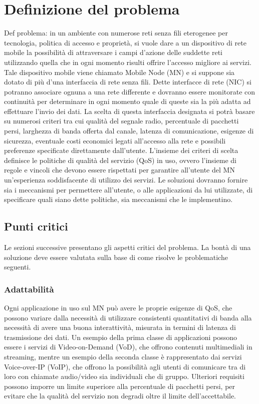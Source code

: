 \documentclass[12pt,a4paper,openright,twoside,draft]{book}
\begin{document}
\chapter{Definizione del problema}
\lhead[\fancyplain{}{\bfseries\thepage}]{\fancyplain{}{\bfseries\rightmark}}
 Def problema: in un ambiente con numerose reti
senza fili eterogenee per tecnologia, politica di accesso e proprietà,
si vuole dare a un dispositivo di rete mobile la possibilità di
attraversare i campi d'azione delle suddette reti utilizzando quella
che in ogni momento risulti offrire l'accesso migliore ai
servizi. Tale dispositivo mobile viene chiamato Mobile Node (MN) e si
suppone sia dotato di più d'una interfaccia di rete senza fili. Dette
interfacce di rete (NIC) si potranno associare ognuna a una rete
differente e dovranno essere monitorate con continuità per determinare
in ogni momento quale di queste sia la più adatta ad effettuare
l'invio dei dati. La scelta di questa interfaccia designata si potrà
basare su numerosi criteri tra cui qualità del segnale radio,
percentuale di pacchetti persi, larghezza di banda offerta dal canale,
latenza di comunicazione, esigenze di sicurezza, eventuale costi
economici legati all'accesso alla rete e possibili preferenze
specificate direttamente dall'utente. L'insieme dei criteri di scelta
definisce le politiche di qualità del servizio (QoS) in uso, ovvero
l'insieme di regole e vincoli che devono essere rispettati per
garantire all'utente del MN un'esperienza soddisfacente di utilizzo
dei servizi. Le soluzioni dovranno fornire sia i meccanismi per
permettere all'utente, o alle applicazioni da lui utilizzate, di
specificare quali siano dette politiche, sia meccanismi che le
implementino.

\section{Punti critici}
\label{sec:punti-critici}
Le sezioni successive presentano gli aspetti critici del problema. La
bontà di una soluzione deve essere valutata sulla base di come risolve
le problematiche seguenti.

\subsection{Adattabilità}
Ogni applicazione in uso sul MN può avere le proprie esigenze di QoS,
che possono variare dalla necessità di utilizzare consistenti
quantitativi di banda alla necessità di avere una buona interattività,
misurata in termini di latenza di trasmissione dei dati. Un esempio
della prima classe di applicazioni possono essere i servizi di
Video-on-Demand (VoD), che offrono contenuti multimediali in
streaming, mentre un esempio della seconda classe è rappresentato dai
servizi Voice-over-IP (VoIP), che offrono la possibilità agli utenti
di comunicare tra di loro con chiamate audio/video sia individuali che
di gruppo. Ulteriori requisiti possono imporre un limite superiore
alla percentuale di pacchetti persi, per evitare che la qualità del
servizio non degradi oltre il limite dell'accettabile.
\end{document}
